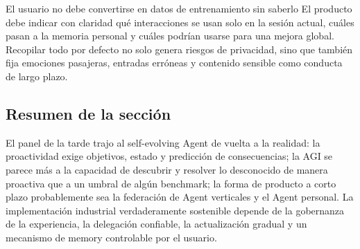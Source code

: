 \begin{warningbox}{El usuario no debe convertirse en datos de entrenamiento sin saberlo}
El producto debe indicar con claridad qué interacciones se usan solo en la sesión actual, cuáles pasan a la memoria personal y cuáles podrían usarse para una mejora global. Recopilar todo por defecto no solo genera riesgos de privacidad, sino que también fija emociones pasajeras, entradas erróneas y contenido sensible como conducta de largo plazo.
\end{warningbox}

\subsection{Resumen de la sección}

El panel de la tarde trajo al self-evolving Agent de vuelta a la realidad: la proactividad exige objetivos, estado y predicción de consecuencias; la AGI se parece más a la capacidad de descubrir y resolver lo desconocido de manera proactiva que a un umbral de algún benchmark; la forma de producto a corto plazo probablemente sea la federación de Agent verticales y el Agent personal. La implementación industrial verdaderamente sostenible depende de la gobernanza de la experiencia, la delegación confiable, la actualización gradual y un mecanismo de memory controlable por el usuario.
